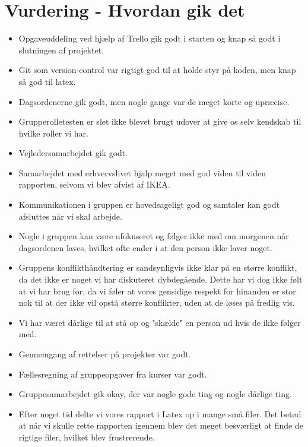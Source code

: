 \documentclass[oneside,a4paper,titlepage]{article}
\begin{document}


\section{Vurdering - Hvordan gik det}
\begin{itemize}
  \item Opgaveuddeling ved hjælp af Trello gik godt i starten og knap så godt i slutningen af projektet.
  \item Git som version-control var rigtigt god til at holde styr på koden, men knap så god til latex.
  \item Dagsordenerne gik godt, men nogle gange var de meget korte og upræcise.
  \item Grupperolletesten er slet ikke blevet brugt udover at give os selv kendskab til hvilke roller vi har.
  \item Vejledersamarbejdet gik godt.
  \item Samarbejdet med erhvervslivet hjalp meget med god viden til viden rapporten, selvom vi blev afvist af IKEA.
  \item Kommunikationen i gruppen er hovedsageligt god og samtaler kan godt afsluttes når vi skal arbejde. 
  \item Nogle i gruppen kan være ufokuseret og følger ikke med om morgenen når dagsordenen laves, hvilket ofte ender i at den person ikke laver noget.
  \item Gruppens konflikthåndtering er sandsynligvis ikke klar på en større konflikt, da det ikke er noget vi har diskuteret dybdegående. Dette har vi dog ikke følt at vi har brug for, da vi føler at vores gensidige respekt for hinanden er stor nok til at der ikke vil opstå større konflikter, uden at de løses på fredlig vis.
  \item Vi har været dårlige til at stå op og "skælde" en person ud hvis de ikke følger med.
  \item Gennemgang af rettelser på projekter var godt.
  \item Fællesregning af gruppeopgaver fra kurser var godt.
  \item Gruppesamarbejdet gik okay, der var nogle gode ting og nogle dårlige ting. 
  \item Efter noget tid delte vi vores rapport i Latex op i mange små filer. Det betød at når vi skulle rette rapporten igennem blev det meget besværligt at finde de rigtige filer, hvilket blev frustrerende. 
\end{itemize}
\end{document}
